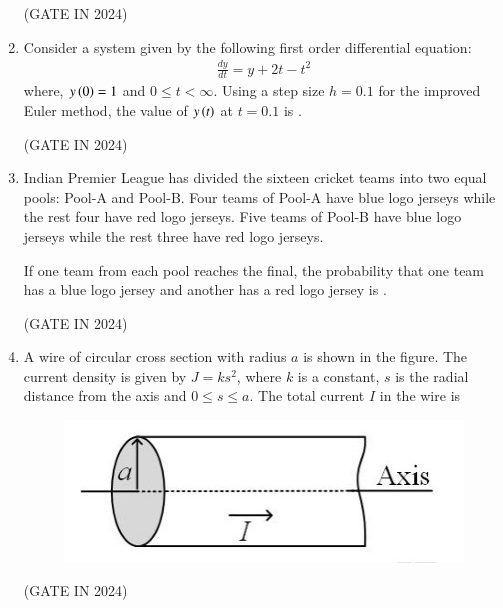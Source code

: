 \documentclass[journal,12pt,onecolumn]{IEEEtran}
\theoremstyle{remark}
\begin{document}
\begin{enumerate}
    \hfill{(GATE IN 2024)}
    
    \item Consider a system given by the following first order differential equation:
    \begin{align*}
        \frac{dy}{dt} = y + 2t - t^2
    \end{align*}
    where, $y\left(0\right) = 1$ and $0 \leq t < \infty$. Using a step size $h = 0.1$ for the improved Euler method, the value of $y\left(t\right)$ at $t = 0.1$ is \underline{\hspace{2cm}} .
    
    \hfill{(GATE IN 2024)}
    
    \item Indian Premier League has divided the sixteen cricket teams into two equal pools: Pool-A and Pool-B. Four teams of Pool-A have blue logo jerseys while the rest four have red logo jerseys. Five teams of Pool-B have blue logo jerseys while the rest three have red logo jerseys.
    
    If one team from each pool reaches the final, the probability that one team has a blue logo jersey and another has a red logo jersey is \underline{\hspace{2cm}} .
    
    \hfill{(GATE IN 2024)}

    \item A wire of circular cross section with radius $a$ is shown in the figure. The current density is given by $J=ks^2$, where $k$ is a constant, $s$ is the radial distance from the axis and $0 \leq s \leq a$. The total current $I$ in the wire is
    \begin{figure}[H]
        \centering
        \includegraphics[width=0.6\columnwidth]{figs/p16.jpg}
        \caption*{}
        \label{fig:p16}
    \end{figure}
    
    \hfill{(GATE IN 2024)}
    \begin{enumerate}
    \end{enumerate}


\end{enumerate}
\end{document}
